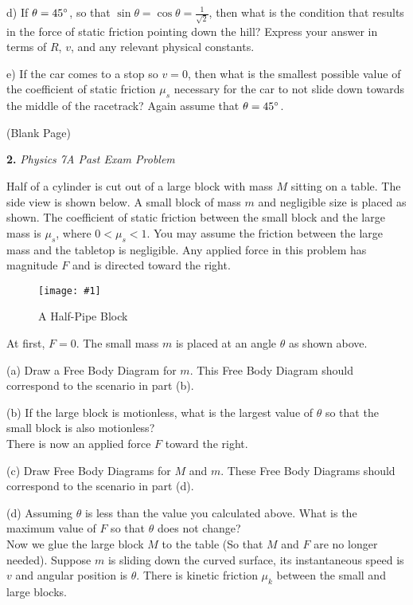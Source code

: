 \documentclass[11pt]{article}
\newcommand{\fig}[4]{
    \begin{figure}[H]
        \centering
        \texttt{[image: \#1]}
        \caption{#2}
        \label{exp4fit}
    \end{figure}
}
\theoremstyle{gangnamstyle}{\newtheorem{definition}{Definition}[]}
\theoremstyle{gangnamstyle}{\newtheorem{example}{Example}[]}
\theoremstyle{gangnamstyle}{\newtheorem{problem}{Problem}[]}
\begin{document}
d) If $\theta = 45 \degree$, so that $\sin\theta = \cos\theta = \frac{1}{\sqrt{2}}$, then what is the condition that results in the force of static friction pointing down the hill? Express your answer in terms of $R$, $v$, and any relevant physical constants.

e) If the car comes to a stop so $v = 0$, then what is the smallest possible value of the coefficient of static friction $\mu_s$ necessary for the car to not slide down towards the middle of the racetrack? Again
assume that $\theta = 45 \degree$. 

\pagebreak

\begin{center}
(Blank Page)
\end{center}

\pagebreak

\textbf{2.} \textit{Physics 7A Past Exam Problem}

Half of a cylinder is cut out of a large block with mass $M$ sitting on a table. The side view is shown below. A small block of mass $m$ and negligible size is placed as shown. The coefficient of static friction between the small block and the large mass is $\mu_s$, where $0 < \mu_s < 1$. You may assume the friction between the large mass and the tabletop is negligible. Any applied force in this problem has magnitude $F$ and is directed toward the right. 

\fig{figs/mt1/blok.png}{A Half-Pipe Block}{0.85}{0}

At first, $F = 0$. The small mass $m$ is placed at an angle $\theta$ as shown above. 

(a) Draw a Free Body Diagram for $m$. This Free Body Diagram should correspond to the scenario in part (b). 

(b) If the large block is motionless, what is the largest value of $\theta$ so that the small block is also motionless? \\

There is now an applied force $F$ toward the right. 

(c) Draw Free Body Diagrams for  $M$ and $m$. These Free Body Diagrams should correspond to the scenario in part (d). 

(d) Assuming $\theta$ is less than the value you calculated above. What is the maximum value of $F$ so that $\theta$ does not change? \\

Now we glue the large block $M$ to the table (So that $M$ and $F$ are no longer needed). Suppose $m$ is sliding down the curved surface, its instantaneous speed is $v$ and angular position is $\theta$. There is kinetic friction $\mu_k$ between the small and large blocks. 
\end{document}
